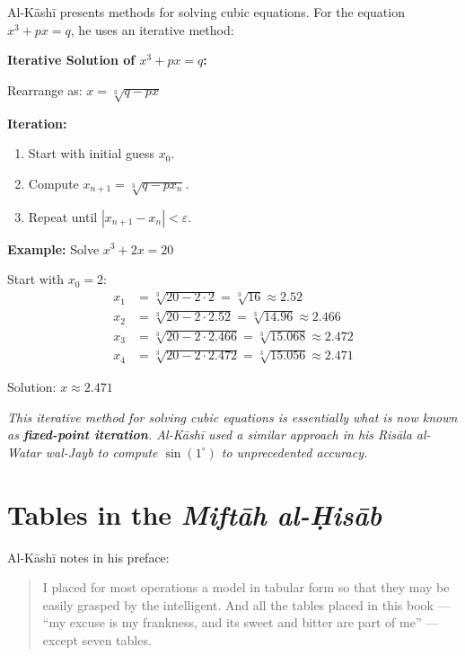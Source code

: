 \documentclass[11pt,a4paper]{article}
\newenvironment{mathalgo}{%
  \par\vspace{0.3cm}
  \begin{framed}
  \setlength{\parindent}{0pt}
}{%
  \end{framed}
  \par\vspace{0.3cm}
}
\newcommand{\cnote}[1]{\textcolor{notecolor}{\textit{#1}}}
\begin{document}
Al-K\=ash\=i presents methods for solving cubic equations. For the equation
$x^3 + px = q$, he uses an iterative method:

\begin{mathalgo}
\textbf{Iterative Solution of $x^3 + px = q$:}

Rearrange as: $x = \sqrt[3]{q - px}$

\textbf{Iteration:}
\begin{enumerate}[nosep]
  \item Start with initial guess $x_0$.
  \item Compute $x_{n+1} = \sqrt[3]{q - p x_n}$.
  \item Repeat until $|x_{n+1} - x_n| < \varepsilon$.
\end{enumerate}

\textbf{Example:} Solve $x^3 + 2x = 20$

Start with $x_0 = 2$:
\begin{align*}
x_1 &= \sqrt[3]{20 - 2 \cdot 2} = \sqrt[3]{16} \approx 2.52 \\
x_2 &= \sqrt[3]{20 - 2 \cdot 2.52} = \sqrt[3]{14.96} \approx 2.466 \\
x_3 &= \sqrt[3]{20 - 2 \cdot 2.466} = \sqrt[3]{15.068} \approx 2.472 \\
x_4 &= \sqrt[3]{20 - 2 \cdot 2.472} = \sqrt[3]{15.056} \approx 2.471
\end{align*}

Solution: $\boxed{x \approx 2.471}$
\end{mathalgo}

\cnote{This iterative method for solving cubic equations is essentially
what is now known as \textbf{fixed-point iteration}. Al-K\=ash\=i used a
similar approach in his \textit{Ris\=ala al-Watar wal-Jayb} to compute
$\sin(1^\circ)$ to unprecedented accuracy.}
\clearpage

\section{Tables in the \textit{Mift\=ah al-\d{H}is\=ab}}
\label{sec:tables}

Al-K\=ash\=i notes in his preface:
\begin{quote}
I placed for most operations a model in tabular form so that they may
be easily grasped by the intelligent. And all the tables placed in
this book --- ``my excuse is my frankness, and its sweet and bitter
are part of me'' --- except seven tables.
\end{quote}
\end{document}
